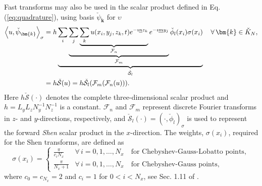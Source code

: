 \documentclass[preprint]{elsarticle}
\newcommand{\N}[1]{\check{#1}}
\begin{document}
Fast transforms may also be used in the scalar product defined in Eq. (\ref{eq:quadrature}), using basis $\N{\psi}_{\bm{k}}$ for $\upsilon$
\begin{align}
 \left< u, \N{\psi}_{\bm{k}} \right>_{\sigma} &= h \underbrace{\sum_i 
 \underbrace{\sum_j \underbrace{\sum_k u(x_i, y_j, z_k, t)  e^{-\imath 
 \underline{n} z_k}}_{\mathcal{F}_n}  e^{-\imath \underline{m} y_j} 
 }_{\mathcal{F}_m} \N{\phi}_{l}(x_i) \sigma(x_i)}_{\N{\mathcal{S}}_l} \quad \forall \, \bm{k} \in \N{K}_N,   \notag \\
  &=  h \N{\mathcal{S}}(u) = h \N{\mathcal{S}}_{l} (\mathcal{F}_{{m}} 
  (\mathcal{F}_{{n}}(u))). \label{eq:sst1}
\end{align}
Here $h\N{\mathcal{S}}(\cdot)$ denotes the complete three-dimensional scalar product 
and $h = L_yL_zN_y^{-1}N_z^{-1}$ is a constant. $\mathcal{F}_{{n}}$ and 
$\mathcal{F}_{{m}}$ represent discrete Fourier transforms in $z$- and 
$y$-directions, respectively, and $\N{\mathcal{S}}_{l}(\cdot) = (\cdot, 
\N{\phi}_l)_{\sigma}$ is used to represent the forward \emph{Shen} scalar product in the 
$x$-direction. The weights, $\sigma(x_i)$, required for the Shen transforms, are defined as
\begin{equation}
 \sigma(x_i) = \begin{cases}
       \frac{\pi}{c_i N_x} &\forall \, i=0,1,\ldots, N_x \quad  \text{for 
       Chebyshev-Gauss-Lobatto points},\\
       \frac{\pi}{N_x+1} &\forall \, i=0,1,\ldots, N_x  \quad \text{for 
       Chebyshev-Gauss points},      
 \end{cases}
\end{equation}
where $c_0 = c_{N_x} = 2$ and $c_i = 1$ for $0 < i < N_x$, see Sec. 1.11 of \cite{kopriva09}.%
\end{document}

